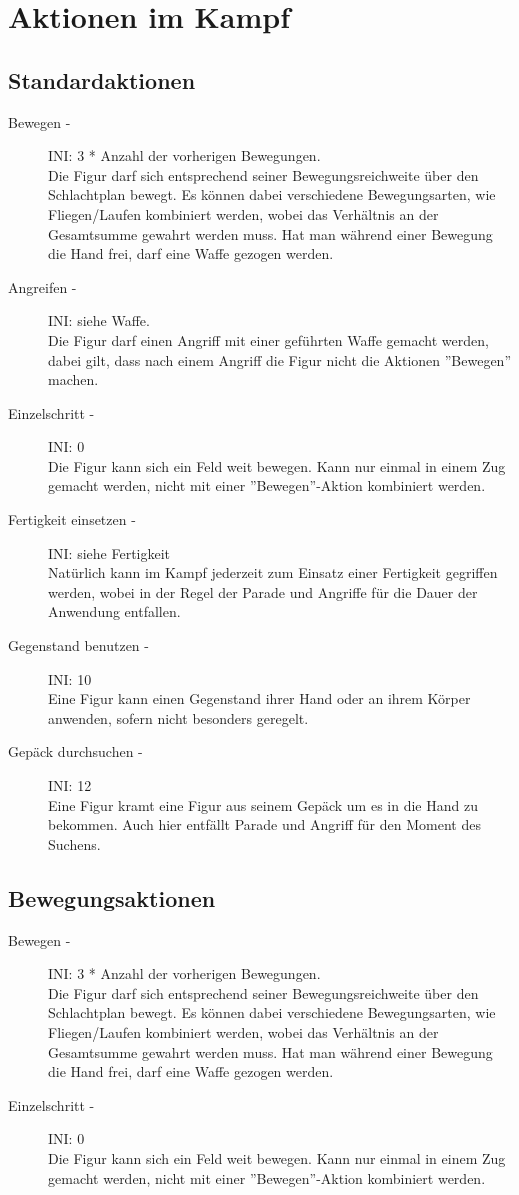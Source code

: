 \documentclass[a4paper,12pt,oneside]{book}
\begin{document}
\chapter{Aktionen im Kampf}

\section{Standardaktionen}
\begin{description}
\item[Bewegen -] INI: 3 * Anzahl der vorherigen Bewegungen.
\\Die Figur darf sich entsprechend seiner Bewegungsreichweite über den Schlachtplan bewegt. Es können dabei verschiedene Bewegungsarten, wie Fliegen/Laufen kombiniert werden, wobei das Verhältnis an der Gesamtsumme gewahrt werden muss. Hat man während einer Bewegung die Hand frei, darf eine Waffe gezogen werden.
\item[Angreifen -] INI: siehe Waffe.
\\Die Figur darf einen Angriff mit einer geführten Waffe gemacht werden, dabei gilt, dass nach einem Angriff die Figur nicht die Aktionen ''Bewegen'' machen.
\item[Einzelschritt -] INI: 0
\\Die Figur kann sich ein Feld weit bewegen. Kann nur einmal in einem Zug gemacht werden, nicht mit einer ''Bewegen''-Aktion kombiniert werden.
\item[Fertigkeit einsetzen -] INI: siehe Fertigkeit
\\Natürlich kann im Kampf jederzeit zum Einsatz einer Fertigkeit gegriffen werden, wobei in der Regel der Parade und Angriffe für die Dauer der Anwendung entfallen.
\item[Gegenstand benutzen -] INI: 10
\\Eine Figur kann einen Gegenstand ihrer Hand oder an ihrem Körper anwenden, sofern nicht besonders geregelt.
\item[Gepäck durchsuchen -] INI: 12
\\Eine Figur kramt eine Figur aus seinem Gepäck um es in die Hand zu bekommen. Auch hier entfällt Parade und Angriff für den Moment des Suchens.
\end{description}

\section{Bewegungsaktionen}
\begin{description}
\item[Bewegen -] INI: 3 * Anzahl der vorherigen Bewegungen.
\\Die Figur darf sich entsprechend seiner Bewegungsreichweite über den Schlachtplan bewegt. Es können dabei verschiedene Bewegungsarten, wie Fliegen/Laufen kombiniert werden, wobei das Verhältnis an der Gesamtsumme gewahrt werden muss. Hat man während einer Bewegung die Hand frei, darf eine Waffe gezogen werden.
\item[Einzelschritt -] INI: 0
\\Die Figur kann sich ein Feld weit bewegen. Kann nur einmal in einem Zug gemacht werden, nicht mit einer ''Bewegen''-Aktion kombiniert werden.
\end{description}
\end{document}
